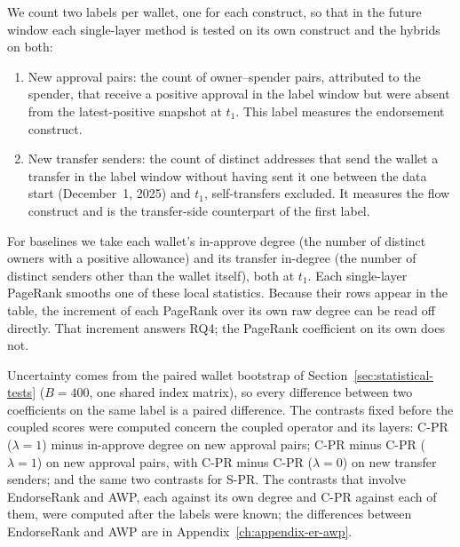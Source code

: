 We count two labels per wallet, one for each construct, so that in the future window each single-layer method is tested on its own construct and the hybrids on both:
\begin{enumerate}
\item New approval pairs: the count of owner--spender pairs, attributed to the spender, that receive a positive approval in the label window but were absent from the latest-positive snapshot at $t_1$. This label measures the endorsement construct.
\item New transfer senders: the count of distinct addresses that send the wallet a transfer in the label window without having sent it one between the data start (December~1, 2025) and $t_1$, self-transfers excluded. It measures the flow construct and is the transfer-side counterpart of the first label.
\end{enumerate}
For baselines we take each wallet's in-approve degree (the number of distinct owners with a positive allowance) and its transfer in-degree (the number of distinct senders other than the wallet itself), both at $t_1$. Each single-layer PageRank smooths one of these local statistics. Because their rows appear in the table, the increment of each PageRank over its own raw degree can be read off directly. That increment answers RQ4; the PageRank coefficient on its own does not.

Uncertainty comes from the paired wallet bootstrap of Section~\ref{sec:statistical-tests} ($B=400$, one shared index matrix), so every difference between two coefficients on the same label is a paired difference. The contrasts fixed before the coupled scores were computed concern the coupled operator and its layers: C-PR ($\lambda=1$) minus in-approve degree on new approval pairs; C-PR minus C-PR ($\lambda=1$) on new approval pairs, with C-PR minus C-PR ($\lambda=0$) on new transfer senders; and the same two contrasts for S-PR. The contrasts that involve EndorseRank and AWP, each against its own degree and C-PR against each of them, were computed after the labels were known; the differences between EndorseRank and AWP are in Appendix~\ref{ch:appendix-er-awp}.

